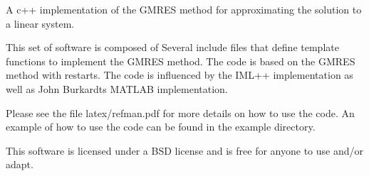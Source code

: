 A c++ implementation of the GMRES method for approximating the solution to a linear system.

This set of software is composed of Several include files that define template functions to implement the GMRES method. The code is based on the GMRES method with restarts. The code is influenced by the IML++ implementation as well as John Burkardt\textquotesingle{}s MATLAB implementation.

Please see the file latex/refman.\+pdf for more details on how to use the code. An example of how to use the code can be found in the example directory.

This software is licensed under a BSD license and is free for anyone to use and/or adapt. 